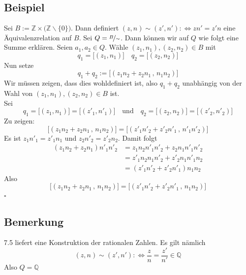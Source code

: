 \subsection{Beispiel} %
\label{sub:beispiel}
Sei $B:= \mathds{Z} \times \big( \mathds{Z} \backslash \{0\} \big)$. Dann definiert 
$(z,n) \sim (z', n') :\Leftrightarrow zn' = z'n$ eine Äquivalenzrelation auf $B$. Sei $Q= \nicefrac{B}{\sim}$.
Dann können wir auf $Q$ wie folgt eine Summe erklären. Seien $a_1 , a_2 \in Q$. Wähle $(z_1, n_1), (z_2, n_2) \in B$ mit
\[
	q_1 = \big[ (z_1, n_1)\big] \quad q_2= \big[ (z_2, n_2) \big]
\]
Nun setze
\[
	q_1 + q_2 := \Big[ (z_1 n_2 + z_2 n_1 \, , \, n_1 n_2)\Big]
\]
\boxed{!} Wir müssen zeigen, dass dies wohldefiniert ist, also $q_1 + q_2$ unabhängig von der Wahl von 
$(z_1, n_1), (z_2, n_2) \in B$ ist.
\vspace{10pt} \\
Sei 
\[
	q_1 = \big[(z_1, n_1)\big] = \big[ (z'_1, n'_1)\big] \quad \text{und} 
	\quad q_2= \big[ (z_2, n_2) \big] = \big[ (z'_2, n'_2)\big]
\]
Zu zeigen:
\[
	\big[ (z_1 n_2 + z_2 n_1 \, , \, n_1 n_2 ) \big] = \big[ (z'_1 n'_2 + z'_2 n'_1 \, , \, n'_1 n'_2) \big]
\]
Es ist $z_1 n'_1 = z'_1 n_1$ und $z_2 n'_2 = z'_2 n_2$. Damit folgt
\begin{align*}
	(z_1 n_2 + z_2 n_1) n'_1 n'_2 &= z_1 n_2 n'_1 n'_2 + z_2 n_1 n'_1 n'_2 \\
	&= z'_1 n_2 n_1 n'_2 + z'_2 n_1 n'_1 n_2 \\
	&= (z'_1 n'_2 + z'_2 n'_1) n_1 n_2
\end{align*}
Also 
\[
	\big[(z_1n_2 + z_2 n_1 \, ,\, n_1 n_2) \big] = \big[ (z'_1 n'_2 + z'_2 n'_1 \, , \, n_1 n_2) \big] 
\]
\hfill \( \square \)

\subsection{Bemerkung} %
\label{sub:bemerkung}
7.5 liefert eine Konstruktion der rationalen Zahlen. Es gilt nämlich
\[
	(z,n) \sim (z',n'):\Leftrightarrow \frac{z}{n} = \frac{z'}{n'} \in \mathds{Q}  
\]
Also $Q=\mathds{Q}$

